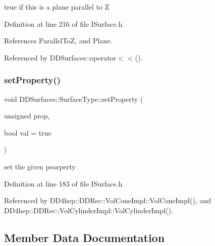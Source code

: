 true if this is a plane parallel to Z 



Definition at line 216 of file I\+Surface.\+h.



References Parallel\+ToZ, and Plane.



Referenced by D\+D\+Surfaces\+::operator$<$$<$().

\hypertarget{class_d_d_surfaces_1_1_surface_type_aac5ebe16c0c230033f68c4e3f5a349af}{}\label{class_d_d_surfaces_1_1_surface_type_aac5ebe16c0c230033f68c4e3f5a349af} 
\subsubsection{\texorpdfstring{set\+Property()}{setProperty()}}
{\footnotesize\ttfamily void D\+D\+Surfaces\+::\+Surface\+Type\+::set\+Property (\begin{DoxyParamCaption}\item[{unsigned}]{prop,  }\item[{bool}]{val = {\ttfamily true} }\end{DoxyParamCaption})\hspace{0.3cm}{\ttfamily [inline]}}



set the given peorperty 



Definition at line 183 of file I\+Surface.\+h.



Referenced by D\+D4hep\+::\+D\+D\+Rec\+::\+Vol\+Cone\+Impl\+::\+Vol\+Cone\+Impl(), and D\+D4hep\+::\+D\+D\+Rec\+::\+Vol\+Cylinder\+Impl\+::\+Vol\+Cylinder\+Impl().



\subsection{Member Data Documentation}
\hypertarget{class_d_d_surfaces_1_1_surface_type_ac6414dd53b60dfcc487030c3ba1a3220}{}\label{class_d_d_surfaces_1_1_surface_type_ac6414dd53b60dfcc487030c3ba1a3220} 
